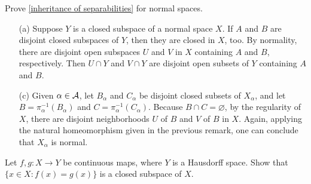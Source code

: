 \begin{prob}\label{inheritance: normal}
    Prove \cref{inheritance of separabilities} for normal spaces.
\end{prob}
\begin{sol}
    \begin{enumerate}
        \item[(a)]
        {    
            Suppose $Y$ is a closed subspace of a normal space $X$.
            If $A$ and $B$ are disjoint closed subspaces of $Y$, then they are closed in $X$, too.
            By normality, there are disjoint open subspaces $U$ and $V$ in $X$ containing $A$ and $B$, respectively.
            Then $U\cap Y$ and $V\cap Y$ are disjoint open subsets of $Y$ containing $A$ and $B$.
        }
        \item[(c)]
        {
            Given $\alpha\in{\mathcal{A}}$, let $B_\alpha$ and $C_\alpha$ be disjoint closed subsets of $X_\alpha$, and let $B=\pi_\alpha^{-1}(B_\alpha)$ and $C=\pi_\alpha^{-1}(C_\alpha)$.
            Because $B\cap C=\varnothing$, by the regularity of $X$, there are disjoint neighborhoods $U$ of $B$ and $V$ of $B$ in $X$.
            Again, applying the natural homeomorphism given in the previous remark, one can conclude that $X_\alpha$ is normal.
        }
    \end{enumerate}
\end{sol}

\color{red}
\begin{prob}
    Let $f, g: X\rightarrow Y$ be continuous maps, where $Y$ is a Hausdorff space.
    Show that $\{x\in X: f(x)=g(x)\}$ is a closed subspace of $X$.
\end{prob}
\begin{sol}
    
\end{sol}
\color{black}